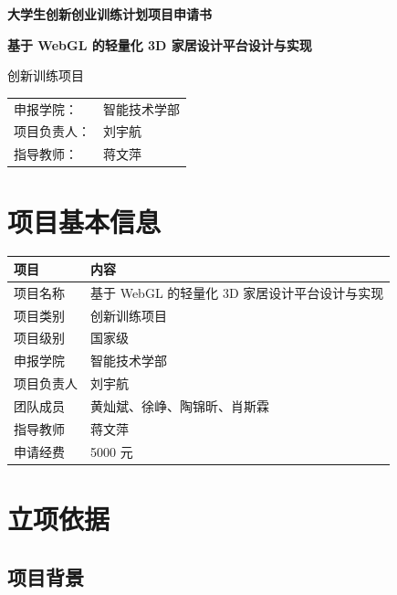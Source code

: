 \documentclass[UTF8,fontset=fandol,zihao=-4]{ctexart}
\begin{document}
\begin{titlepage}
  \centering
  \vspace*{2.5cm}
  {\bfseries 大学生创新创业训练计划项目申请书\par}
  \vspace{2.2cm}
  {\bfseries 基于 WebGL 的轻量化 3D 家居设计平台设计与实现\par}
  \vspace{1.5cm}
  { 创新训练项目\par}
  \vfill
  \begin{tabular}{P{4cm}P{8cm}}
    申报学院： & 智能技术学部 \\
    项目负责人： & 刘宇航 \\
    指导教师： & 蒋文萍 \\
  \end{tabular}
  \vspace*{2cm}
\end{titlepage}

\tableofcontents
\newpage

\section{项目基本信息}

\begin{table}[h]
\centering
\begin{tabularx}{\textwidth}{P{3.2cm}Y}
\toprule
项目 & 内容 \\
\midrule
项目名称 & 基于 WebGL 的轻量化 3D 家居设计平台设计与实现 \\
项目类别 & 创新训练项目 \\
项目级别 & 国家级 \\
申报学院 & 智能技术学部 \\
项目负责人 & 刘宇航 \\
团队成员 & 黄灿斌、徐峥、陶锦昕、肖斯霖 \\
指导教师 & 蒋文萍 \\
申请经费 & 5000 元 \\
\bottomrule
\end{tabularx}
\end{table}

\section{立项依据}

\subsection{项目背景}
\end{document}
